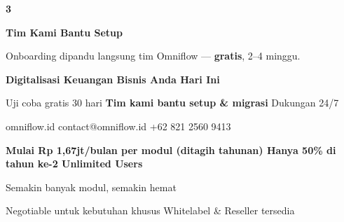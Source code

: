 \documentclass[a4paper]{article}
\begin{document}
\begin{center}
\begin{minipage}[t]{0.318\textwidth}
{\begin{minipage}[t][4.7cm][c]{\dimexpr\linewidth-2\fboxsep\relax}
            \begin{center}
                {\fontsize{22}{26}\selectfont\bfseries\color{BluePrimary} 3}
            \end{center}
            \vspace{2pt}
            \begin{center}
                {\fontsize{10}{13}\selectfont\bfseries\color{BlueDark} Tim Kami Bantu Setup}\par\vspace{3pt}
                {\fontsize{9}{12}\selectfont\color{TextDark} Onboarding dipandu langsung tim Omniflow --- \textbf{gratis}, 2--4 minggu.}
            \end{center}
        \end{minipage}}
\end{minipage}
\end{center}

\vspace{8pt}

{\setlength{\fboxsep}{10pt}\setlength{\fboxrule}{0pt}%
\noindent\colorbox{BluePrimary}{%
    \begin{minipage}{\dimexpr\textwidth-2\fboxsep\relax}
        \centering
        {\fontsize{13}{16}\selectfont\bfseries\color{White}
        Digitalisasi Keuangan Bisnis Anda Hari Ini}\par\vspace{3pt}
        {\fontsize{9.5}{12}\selectfont\color{BlueMid}
        Uji coba gratis 30 hari \enspace\textbullet\enspace \textbf{Tim kami bantu setup \& migrasi} \enspace\textbullet\enspace Dukungan 24/7}\par\vspace{2pt}
        {\fontsize{9.5}{12}\selectfont\color{BlueLight}
        omniflow.id \enspace\textbullet\enspace contact@omniflow.id \enspace\textbullet\enspace +62 821 2560 9413}
    \end{minipage}}}


\vspace{6pt}

{\setlength{\fboxsep}{8pt}\setlength{\fboxrule}{0pt}%
\noindent\colorbox{BlueBg}{%
    \begin{minipage}{\dimexpr\textwidth-2\fboxsep\relax}
        \centering
        {\fontsize{9}{12}\selectfont\bfseries\color{BluePrimary}
        Mulai Rp 1,67jt/bulan per modul (ditagih tahunan) \enspace\textbullet\enspace Hanya 50\% di tahun ke-2 \enspace\textbullet\enspace Unlimited Users}\par\vspace{1pt}
        {\fontsize{8.5}{11}\selectfont\color{BlueDark}
        Semakin banyak modul, semakin hemat}\par\vspace{1pt}
        {\fontsize{8}{10}\selectfont\color{TextLight}
        Negotiable untuk kebutuhan khusus \enspace\textbullet\enspace Whitelabel \& Reseller tersedia}
    \end{minipage}}}

\restoregeometry
\pagestyle{empty}
\end{document}

